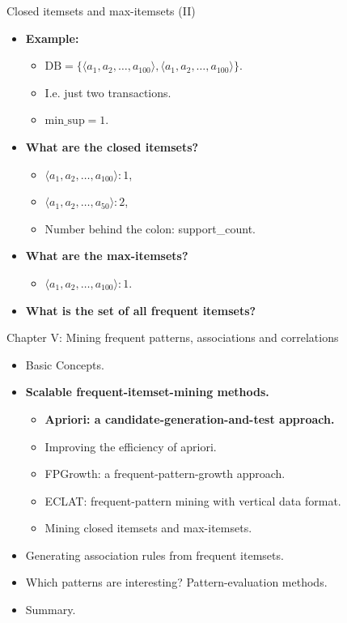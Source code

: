 \documentclass[aspectratio=169,t,xcolor=dvipsnames]{beamer}
\begin{document}
  {
    \begin{frame}{Closed itemsets and max-itemsets (II)}
    \begin{itemize}
      \item \textbf{Example:}
      \begin{itemize}
        \item $\text{DB} = \{\langle a_1,a_2, \ldots, a_{100} \rangle, \langle a_1, a_2, \ldots, a_{100} \rangle \}$.
        \item I.e. just two transactions.
        \item $\text{min\_sup} = 1$.
      \end{itemize}
      \item \textbf{What are the closed itemsets?}
      \begin{itemize}
        \item $\langle a_1,a_2, \ldots, a_{100} \rangle : 1$,
        \item $\langle a_1,a_2, \ldots, a_{50} \rangle : 2$,
        \item Number behind the colon: support\_count.
      \end{itemize}
      \item \textbf{What are the max-itemsets?}
      \begin{itemize}
        \item $\langle a_1,a_2, \ldots, a_{100} \rangle : 1$.
      \end{itemize}
      \item \textbf{What is the set of all frequent itemsets?}
    \end{itemize}
    \end{frame}
  }

  {
    \begin{frame}{Chapter V: Mining frequent patterns, associations and correlations}
        \begin{itemize}
            \item Basic Concepts.
            \item \textbf{Scalable frequent-itemset-mining methods.}
            \begin{itemize}
              \item \textbf{Apriori: a candidate-generation-and-test approach.}
              \item Improving the efficiency of apriori.
              \item FPGrowth:  a frequent-pattern-growth approach.
              \item ECLAT: frequent-pattern mining with vertical data format.
              \item Mining closed itemsets and max-itemsets.
            \end{itemize}
            \item Generating association rules from frequent itemsets.
            \item Which patterns are interesting? Pattern-evaluation methods.
            \item Summary.
        \end{itemize}
    \end{frame}
  }
\end{document}
